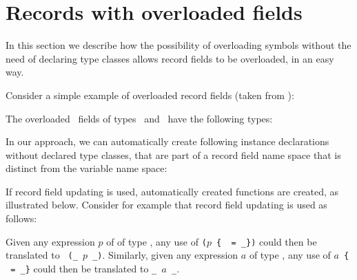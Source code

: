 \section{Records with overloaded fields}
\label{sec:overloaded-record-fields}

In this section we describe how the possibility of overloading symbols
without the need of declaring type classes allows record fields to be
overloaded, in an easy way.

Consider a simple example of overloaded record fields (taken from
\cite{overloaded-record-fields-in-ghc}):

\progb{\data\ \Address\ \= = \Address\ \= \{ \id\ :: \Int, \address\ \= :: \String\ \= \kill
\data\ \Person\  \> = \Person\  \> \{ \id\ :: \Int, \name\    \> :: \String\ \>\}\\
\data\ \Address\ \> = \Address\ \> \{ \id\ :: \Int, \address\ \> :: \String\ \>\}
}

The overloaded \id\ fields of types \Person\ and \Address\ have the
following types:

\progb{\id\ :: \Address\ \= \kill
\id\ :: \Person\  \>$\rightarrow$ \Int\\
\id\ :: \Address\ \>$\rightarrow$ \Int
}

In our approach, we can automatically create following instance
declarations without declared type classes, that are part of a record
field name space that is distinct from the variable name space:


If record field updating is used, automatically created functions are
created, as illustrated below. Consider for example that record field
updating is used as follows:


Given any expression $p$ of of type \Person, any use of {\tt ($p$ \{
  \id\ = \new\_\id \})} could then be translated to {\tt
  (\update\_\id\ $p$ \new\_\id)}. Similarly, given any expression $a$
of type \Address, any use of {\tt $a$ \{ \id\ = \new\_\id \}} could
then be translated to {\tt \update\_\id\ $a$ \new\_\id}.

